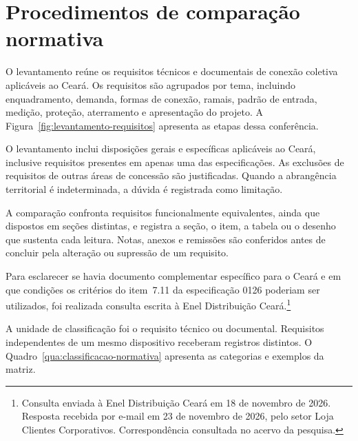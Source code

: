 \section{Procedimentos de comparação normativa}
\label{sec:procedimento}

O levantamento reúne os requisitos técnicos e documentais de conexão coletiva aplicáveis ao Ceará. Os requisitos são agrupados por tema, incluindo enquadramento, demanda, formas de conexão, ramais, padrão de entrada, medição, proteção, aterramento e apresentação do projeto. A Figura~\ref{fig:levantamento-requisitos} apresenta as etapas dessa conferência.

\par\noindent
\begin{minipage}{\linewidth}
  \label{fig:levantamento-requisitos}
  \vspace{0.7\baselineskip}
  {\centering\par}
\end{minipage}
\par

O levantamento inclui disposições gerais e específicas aplicáveis ao Ceará, inclusive requisitos presentes em apenas uma das especificações. As exclusões de requisitos de outras áreas de concessão são justificadas. Quando a abrangência territorial é indeterminada, a dúvida é registrada como limitação.

A comparação confronta requisitos funcionalmente equivalentes, ainda que dispostos em seções distintas, e registra a seção, o item, a tabela ou o desenho que sustenta cada leitura. Notas, anexos e remissões são conferidos antes de concluir pela alteração ou supressão de um requisito.

Para esclarecer se havia documento complementar específico para o Ceará e em que condições os critérios do item~7.11 da especificação 0126 poderiam ser utilizados, foi realizada consulta escrita à Enel Distribuição Ceará.\footnote{Consulta enviada à Enel Distribuição Ceará em 18 de novembro de 2026. Resposta recebida por e-mail em 23 de novembro de 2026, pelo setor Loja Clientes Corporativos. Correspondência consultada no acervo da pesquisa.}

A unidade de classificação foi o requisito técnico ou documental. Requisitos independentes de um mesmo dispositivo receberam registros distintos. O Quadro~\ref{qua:classificacao-normativa} apresenta as categorias e exemplos da matriz.

